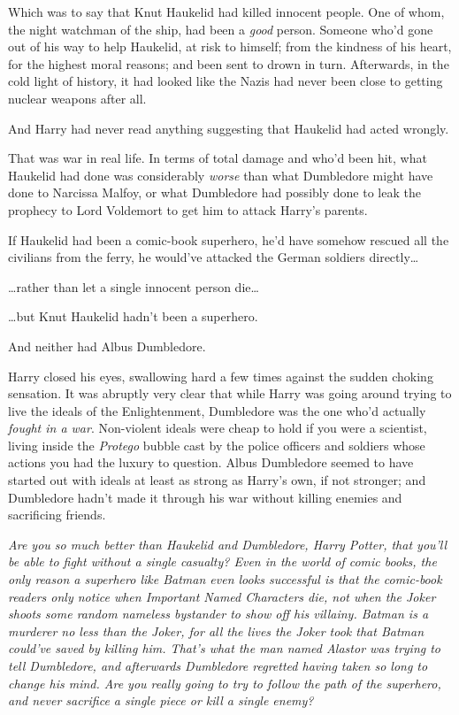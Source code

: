 Which was to say that Knut Haukelid had killed innocent people. One of whom, the night watchman of the ship, had been a \emph{good} person. Someone who'd gone out of his way to help Haukelid, at risk to himself; from the kindness of his heart, for the highest moral reasons; and been sent to drown in turn. Afterwards, in the cold light of history, it had looked like the Nazis had never been close to getting nuclear weapons after all.

And Harry had never read anything suggesting that Haukelid had acted wrongly.

That was war in real life. In terms of total damage and who'd been hit, what Haukelid had done was considerably \emph{worse} than what Dumbledore might have done to Narcissa Malfoy, or what Dumbledore had possibly done to leak the prophecy to Lord Voldemort to get him to attack Harry's parents.

If Haukelid had been a comic-book superhero, he'd have somehow rescued all the civilians from the ferry, he would've attacked the German soldiers directly{\ldots}

{\ldots}rather than let a single innocent person die{\ldots}

{\ldots}but Knut Haukelid hadn't been a superhero.

And neither had Albus Dumbledore.

Harry closed his eyes, swallowing hard a few times against the sudden choking sensation. It was abruptly very clear that while Harry was going around trying to live the ideals of the Enlightenment, Dumbledore was the one who'd actually \emph{fought in a war}. Non-violent ideals were cheap to hold if you were a scientist, living inside the \emph{Protego} bubble cast by the police officers and soldiers whose actions you had the luxury to question. Albus Dumbledore seemed to have started out with ideals at least as strong as Harry's own, if not stronger; and Dumbledore hadn't made it through his war without killing enemies and sacrificing friends.

\emph{Are you so much better than Haukelid and Dumbledore, Harry Potter, that you'll be able to fight without a single casualty? Even in the world of comic books, the only reason a superhero like Batman even \emph{looks} successful is that the comic-book readers only notice when Important Named Characters die, not when the Joker shoots some random nameless bystander to show off his villainy. Batman is a murderer no less than the Joker, for all the lives the Joker took that Batman could've saved by killing him. That's what the man named Alastor was trying to tell Dumbledore, and afterwards Dumbledore regretted having taken so long to change his mind. Are you really going to try to follow the path of the superhero, and never sacrifice a single piece or kill a single enemy?}

